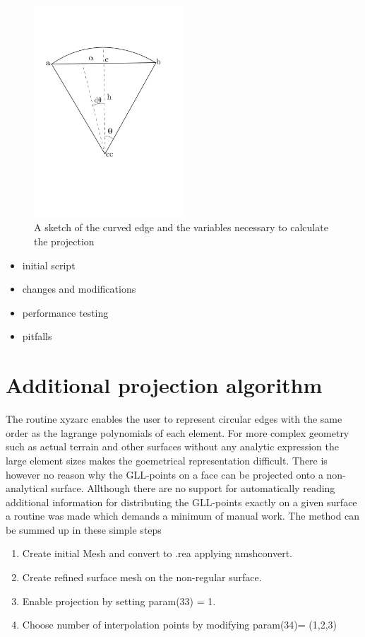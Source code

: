\begin{figure}[h]
    \centering
    \includegraphics[width = 0.5\textwidth]{Figures/curvature.pdf}
    \caption{A sketch of the curved edge and the variables necessary to calculate the projection}
    \label{fig:curvature}
\end{figure}


\begin{itemize}
	\item initial script
	\item changes and modifications
	\item performance testing
	\item pitfalls
\end{itemize}


\section{Additional projection algorithm}
The routine xyzarc enables the user to represent circular edges with the same order as
the lagrange polynomials of each element. For more complex geometry such as actual 
terrain and other surfaces without any analytic expression the large element sizes 
makes the goemetrical representation difficult. There is however no reason why the 
GLL-points on a face can be projected onto a non-analytical surface. Allthough there
are no support for automatically reading additional information for distributing the 
GLL-points exactly on a given surface a routine was made which demands a minimum of 
manual work. The method can be summed up in these simple steps
\begin{enumerate}
    \item Create initial Mesh and convert to .rea applying nmshconvert.
        \item Create refined surface mesh on the non-regular surface.
        \item Enable projection by setting param(33) = 1.
        \item Choose number of interpolation points by modifying param(34)= (1,2,3)
\end{enumerate}

